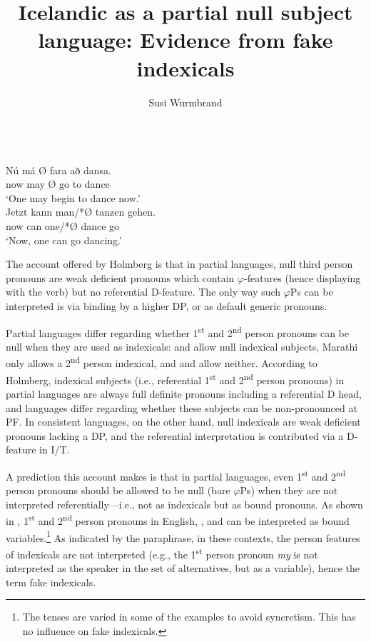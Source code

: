 \documentclass[output=paper]{LSP/langsci}
\author{Susi Wurmbrand\affiliation{University of Connecticut}
}
\title{Icelandic  as a partial null subject language: {E}vidence from fake indexicals}
\begin{document}
 


\ea\label{ex:wurmbrand:}
\ea
{}\\
\gll Nú  má Ø   fara  að  dansa.\\
now  may  Ø  go  to  dance\\
\glt  ‘One may begin to dance now.’
\ex
{}\\
\gll Jetzt  kann \checkmark man/*Ø  tanzen  gehen.\\
now  can  \checkmark one/*Ø  dance  go\\
\glt ‘Now, one can go dancing.’
\z
\z

The account offered by Holmberg is that in partial  languages, null third person pronouns are weak deficient pronouns which contain $\varphi $-features (hence displaying  with the verb) but no referential D-feature. The only way such $\varphi $Ps can be interpreted is via binding by a higher DP, or as default generic pronouns.


Partial  languages differ regarding whether 1\textsuperscript{st} and 2\textsuperscript{nd} person pronouns can be null when they are used as indexicals:  and  allow null indexical subjects, Marathi only allows a 2\textsuperscript{nd} person indexical, and  and  allow neither. According to Holmberg, indexical subjects (i.e., referential 1\textsuperscript{st} and 2\textsuperscript{nd} person pronouns) in partial  languages are always full definite pronouns including a referential D head, and languages differ regarding whether these subjects can be non-pronounced at PF. In consistent  languages, on the other hand, null indexicals are weak deficient pronouns lacking a DP, and the referential interpretation is contributed via a D-feature in I/T.


  A prediction this account makes is that in partial  languages, even 1\textsuperscript{st} and 2\textsuperscript{nd} person pronouns should be allowed to be null (bare $\varphi $Ps) when they are not interpreted referentially—i.e., not as indexicals but as bound pronouns. As shown in , 1\textsuperscript{st} and 2\textsuperscript{nd} person pronouns in English, , and  can be interpreted as bound variables.\footnote{ The tenses are varied in some of the examples to avoid syncretism. This has no influence on fake indexicals.} As indicated by the paraphrase, in these contexts, the person features of indexicals are not interpreted (e.g., the 1\textsuperscript{st} person pronoun \textit{my} is not interpreted as the speaker in the set of alternatives, but as a variable), hence the term fake indexicals.
\end{document}
